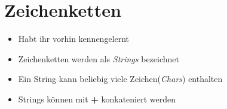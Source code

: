 %

\subsection{}
\section{Zeichenketten}

\begin{frame}
    \slidehead
    \begin{itemize}[<+->]
        \item Habt ihr vorhin kennengelernt
        \item Zeichenketten werden als \textit{Strings} bezeichnet
        \item Ein String kann beliebig viele Zeichen(\textit{Chars}) enthalten
        \item Strings können mit \textbf{+} konkateniert werden
    \end{itemize}
\end{frame}




